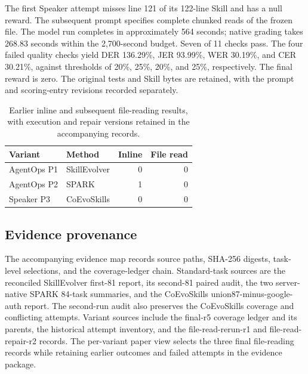 The first Speaker attempt misses line 121 of its 122-line Skill and has a null reward. The subsequent prompt specifies complete chunked reads of the frozen file. The model run completes in approximately 564 seconds; native grading takes 268.83 seconds within the 2,700-second budget. Seven of 11 checks pass. The four failed quality checks yield DER 136.29\%, JER 93.99\%, WER 30.19\%, and CER 30.21\%, against thresholds of 20\%, 25\%, 20\%, and 25\%, respectively. The final reward is zero. The original tests and Skill bytes are retained, with the prompt and scoring-entry revisions recorded separately.

\begin{table}[ht]
\centering\small
\setlength{\tabcolsep}{3pt}
\begin{tabular}{llrr}
\toprule
Variant & Method & Inline & File read\\
\midrule
AgentOps P1 & SkillEvolver & 0 & 0\\
AgentOps P2 & SPARK & 1 & 0\\
Speaker P3 & CoEvoSkills & 0 & 0\\
\bottomrule
\end{tabular}
\caption{Earlier inline and subsequent file-reading results, with execution and repair versions retained in the accompanying records.}
\label{tab:file-reading-records}
\end{table}

\subsection{Evidence provenance}
The accompanying evidence map records source paths, SHA-256 digests, task-level selections, and the coverage-ledger chain. Standard-task sources are the reconciled SkillEvolver first-81 report, its second-81 paired audit, the two server-native SPARK 84-task summaries, and the CoEvoSkills union87-minus-google-auth report. The second-run audit also preserves the CoEvoSkills coverage and conflicting attempts. Variant sources include the final-r5 coverage ledger and its parents, the historical attempt inventory, and the file-read-rerun-r1 and file-read-repair-r2 records. The per-variant paper view selects the three final file-reading records while retaining earlier outcomes and failed attempts in the evidence package.
